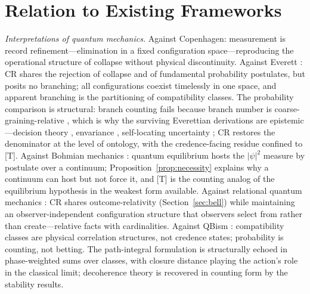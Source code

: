 \documentclass[11pt]{article}
\theoremstyle{definition}
\theoremstyle{remark}
\begin{document}
\section{Relation to Existing Frameworks}\label{sec:related}
\emph{Interpretations of quantum mechanics.} Against Copenhagen: measurement is record refinement---elimination in a fixed configuration space---reproducing the operational structure of collapse without physical discontinuity. Against Everett \cite{Wallace2012}: CR shares the rejection of collapse and of fundamental probability postulates, but posits no branching; all configurations coexist timelessly in one space, and apparent branching is the partitioning of compatibility classes. The probability comparison is structural: branch counting fails because branch number is coarse-graining-relative \cite{Graham1973,Wallace2012}, which is why the surviving Everettian derivations are epistemic---decision theory \cite{Deutsch1999,Wallace2007}, envariance \cite{Zurek2005}, self-locating uncertainty \cite{SebensCarroll2018}; CR restores the denominator at the level of ontology, with the credence-facing residue confined to [T]. Against Bohmian mechanics \cite{Durr1992}: quantum equilibrium hosts the $|\psi|^2$ measure by postulate over a continuum; Proposition~\ref{prop:necessity} explains why a continuum can host but not force it, and [T] is the counting analog of the equilibrium hypothesis in the weakest form available. Against relational quantum mechanics \cite{Rovelli1996,DiBiagio2021}: CR shares outcome-relativity (Section~\ref{sec:bell}) while maintaining an observer-independent configuration structure that observers select from rather than create---relative facts with cardinalities. Against QBism \cite{Fuchs2014}: compatibility classes are physical correlation structures, not credence states; probability is counting, not betting. The path-integral formulation is structurally echoed in phase-weighted sums over classes, with closure distance playing the action's role in the classical limit; decoherence theory \cite{Zurek2003,Zurek2009} is recovered in counting form by the stability results.
\end{document}
